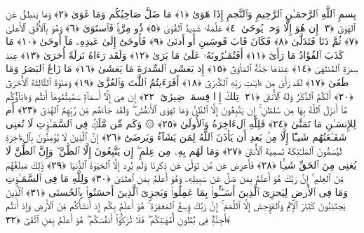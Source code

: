 
  
    
  
    
    

\nopagebreak
  بِسمِ ٱللَّهِ ٱلرَّحمَـٰنِ ٱلرَّحِيمِ
  وَٱلنَّجمِ إِذَا هَوَىٰ ﴿١﴾
 مَا ضَلَّ صَاحِبُكُم وَمَا غَوَىٰ ﴿٢﴾
 وَمَا يَنطِقُ عَنِ ٱلهَوَىٰٓ ﴿٣﴾
 إِن هُوَ إِلَّا وَحىٌۭ يُوحَىٰ ﴿٤﴾
 عَلَّمَهُۥ شَدِيدُ ٱلقُوَىٰ ﴿٥﴾
 ذُو مِرَّةٍۢ فَٱستَوَىٰ ﴿٦﴾
 وَهُوَ بِٱلأُفُقِ ٱلأَعلَىٰ ﴿٧﴾
 ثُمَّ دَنَا فَتَدَلَّىٰ ﴿٨﴾
 فَكَانَ قَابَ قَوسَينِ أَو أَدنَىٰ ﴿٩﴾
 فَأَوحَىٰٓ إِلَىٰ عَبدِهِۦ مَآ أَوحَىٰ ﴿١٠﴾
 مَا كَذَبَ ٱلفُؤَادُ مَا رَأَىٰٓ ﴿١١﴾
 أَفَتُمَـٰرُونَهُۥ عَلَىٰ مَا يَرَىٰ ﴿١٢﴾
 وَلَقَد رَءَاهُ نَزلَةً أُخرَىٰ ﴿١٣﴾
 عِندَ سِدرَةِ ٱلمُنتَهَىٰ ﴿١٤﴾
 عِندَهَا جَنَّةُ ٱلمَأوَىٰٓ ﴿١٥﴾
 إِذ يَغشَى ٱلسِّدرَةَ مَا يَغشَىٰ ﴿١٦﴾
 مَا زَاغَ ٱلبَصَرُ وَمَا طَغَىٰ ﴿١٧﴾
 لَقَد رَأَىٰ مِن ءَايَـٰتِ رَبِّهِ ٱلكُبرَىٰٓ ﴿١٨﴾
 أَفَرَءَيتُمُ ٱللَّٰتَ وَٱلعُزَّىٰ ﴿١٩﴾
 وَمَنَوٰةَ ٱلثَّالِثَةَ ٱلأُخرَىٰٓ ﴿٢٠﴾
 أَلَكُمُ ٱلذَّكَرُ وَلَهُ ٱلأُنثَىٰ ﴿٢١﴾
 تِلكَ إِذًۭا قِسمَةٌۭ ضِيزَىٰٓ ﴿٢٢﴾
 إِن هِىَ إِلَّآ أَسمَآءٌۭ سَمَّيتُمُوهَآ أَنتُم وَءَابَآؤُكُم مَّآ أَنزَلَ ٱللَّهُ بِهَا مِن سُلطَٰنٍ ۚ إِن يَتَّبِعُونَ إِلَّا ٱلظَّنَّ وَمَا تَهوَى ٱلأَنفُسُ ۖ وَلَقَد جَآءَهُم مِّن رَّبِّهِمُ ٱلهُدَىٰٓ ﴿٢٣﴾
 أَم لِلإِنسَـٰنِ مَا تَمَنَّىٰ ﴿٢٤﴾
 فَلِلَّهِ ٱلءَاخِرَةُ وَٱلأُولَىٰ ﴿٢٥﴾
 ۞ وَكَم مِّن مَّلَكٍۢ فِى ٱلسَّمَـٰوَٟتِ لَا تُغنِى شَفَـٰعَتُهُم شَيـًٔا إِلَّا مِنۢ بَعدِ أَن يَأذَنَ ٱللَّهُ لِمَن يَشَآءُ وَيَرضَىٰٓ ﴿٢٦﴾
 إِنَّ ٱلَّذِينَ لَا يُؤمِنُونَ بِٱلءَاخِرَةِ لَيُسَمُّونَ ٱلمَلَـٰٓئِكَةَ تَسمِيَةَ ٱلأُنثَىٰ ﴿٢٧﴾
 وَمَا لَهُم بِهِۦ مِن عِلمٍ ۖ إِن يَتَّبِعُونَ إِلَّا ٱلظَّنَّ ۖ وَإِنَّ ٱلظَّنَّ لَا يُغنِى مِنَ ٱلحَقِّ شَيـًۭٔا ﴿٢٨﴾
 فَأَعرِض عَن مَّن تَوَلَّىٰ عَن ذِكرِنَا وَلَم يُرِد إِلَّا ٱلحَيَوٰةَ ٱلدُّنيَا ﴿٢٩﴾
 ذَٟلِكَ مَبلَغُهُم مِّنَ ٱلعِلمِ ۚ إِنَّ رَبَّكَ هُوَ أَعلَمُ بِمَن ضَلَّ عَن سَبِيلِهِۦ وَهُوَ أَعلَمُ بِمَنِ ٱهتَدَىٰ ﴿٣٠﴾
 وَلِلَّهِ مَا فِى ٱلسَّمَـٰوَٟتِ وَمَا فِى ٱلأَرضِ لِيَجزِىَ ٱلَّذِينَ أَسَـٰٓـُٔوا۟ بِمَا عَمِلُوا۟ وَيَجزِىَ ٱلَّذِينَ أَحسَنُوا۟ بِٱلحُسنَى ﴿٣١﴾
 ٱلَّذِينَ يَجتَنِبُونَ كَبَٰٓئِرَ ٱلإِثمِ وَٱلفَوَٟحِشَ إِلَّا ٱللَّمَمَ ۚ إِنَّ رَبَّكَ وَٟسِعُ ٱلمَغفِرَةِ ۚ هُوَ أَعلَمُ بِكُم إِذ أَنشَأَكُم مِّنَ ٱلأَرضِ وَإِذ أَنتُم أَجِنَّةٌۭ فِى بُطُونِ أُمَّهَـٰتِكُم ۖ فَلَا تُزَكُّوٓا۟ أَنفُسَكُم ۖ هُوَ أَعلَمُ بِمَنِ ٱتَّقَىٰٓ ﴿٣٢﴾
